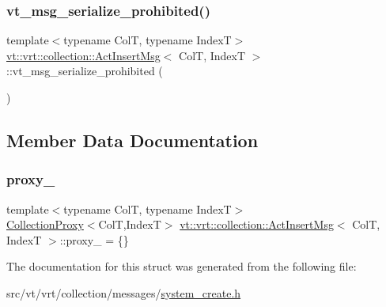 \subsubsection{\texorpdfstring{vt\+\_\+msg\+\_\+serialize\+\_\+prohibited()}{vt\_msg\_serialize\_prohibited()}}
{\footnotesize\ttfamily template$<$typename ColT, typename IndexT$>$ \\
\hyperlink{structvt_1_1vrt_1_1collection_1_1_act_insert_msg}{vt\+::vrt\+::collection\+::\+Act\+Insert\+Msg}$<$ ColT, IndexT $>$\+::vt\+\_\+msg\+\_\+serialize\+\_\+prohibited (\begin{DoxyParamCaption}{ }\end{DoxyParamCaption})}



\subsection{Member Data Documentation}
\mbox{\label{structvt_1_1vrt_1_1collection_1_1_act_insert_msg_a2be9c49b1ec5c2706be27f75d8b3a168}} 
\subsubsection{\texorpdfstring{proxy\+\_\+}{proxy\_}}
{\footnotesize\ttfamily template$<$typename ColT, typename IndexT$>$ \\
\hyperlink{structvt_1_1vrt_1_1collection_1_1_collection_proxy}{Collection\+Proxy}$<$ColT,IndexT$>$ \hyperlink{structvt_1_1vrt_1_1collection_1_1_act_insert_msg}{vt\+::vrt\+::collection\+::\+Act\+Insert\+Msg}$<$ ColT, IndexT $>$\+::proxy\+\_\+ = \{\}}



The documentation for this struct was generated from the following file\+:\begin{DoxyCompactItemize}
\item 
src/vt/vrt/collection/messages/\hyperlink{system__create_8h}{system\+\_\+create.\+h}\end{DoxyCompactItemize}
